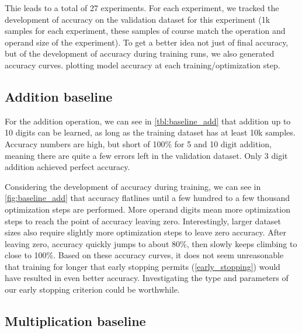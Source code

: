 Thie leads to a total of 27 experiments.
For each experiment, we tracked the development of accuracy on the validation dataset for this experiment (1k samples for each experiment, these samples of course match the operation and operand size of the experiment).
To get a better idea not just of final accuracy, but of the development of accuracy during training runs, we also generated accuracy curves. plotting model accuracy at each training/optimization step.


\subsection{Addition baseline}

For the addition operation, we can see in \cref{tbl:baseline_add} that addition up to 10 digits can be learned, as long as the training dataset has at least 10k samples. Accuracy numbers are high, but short of 100\% for 5 and 10 digit addition, meaning there are quite a few errors left in the validation dataset. Only 3 digit addition achieved perfect accuracy.

Considering the development of accuracy during training, we can see in \cref{fig:baseline_add} that accuracy flatlines until a few hundred to a few thousand optimization steps are performed. More operand digits mean more optimization steps to reach the point of accuracy leaving zero. Interestingly, larger dataset sizes also require slightly more optimization steps to leave zero accuracy.
After leaving zero, accuracy quickly jumps to about 80\%, then slowly keeps climbing to close to 100\%.
Based on these accuracy curves, it does not seem unreasonable that training for longer that early stopping permits (\cref{early_stopping}) would have resulted in even better accuracy. Investigating the type and parameters of our early stopping criterion could be worthwhile.



\subsection{Multiplication baseline}

